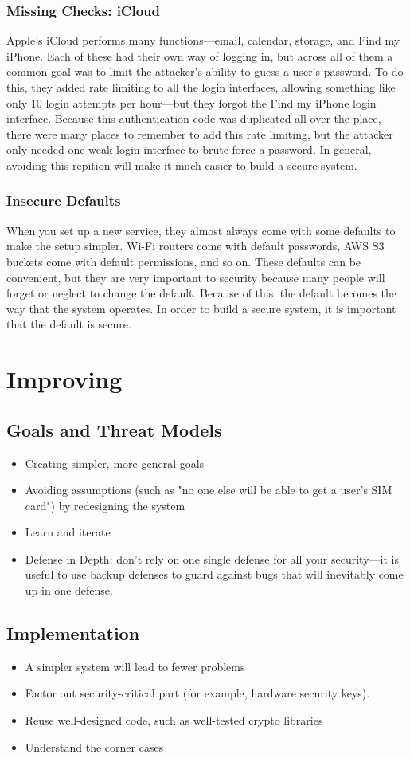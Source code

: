 \subsubsection{Missing Checks: iCloud}
Apple's iCloud performs many functions---email, calendar, storage, and Find my iPhone. Each of these had their own way of logging in, but across all of them a common goal was to limit the attacker's ability to guess a user's password. To do this, they added rate limiting to all the login interfaces, allowing something like only 10 login attempts per hour---but they forgot the Find my iPhone login interface. Because this authentication code was duplicated all over the place, there were many places to remember to add this rate limiting, but the attacker only needed one weak login interface to brute-force a password. In general, avoiding this repition will make it much easier to build a secure system.

\subsubsection{Insecure Defaults}
When you set up a new service, they almost always come with some defaults to make the setup simpler. Wi-Fi routers come with default passwords, AWS S3 buckets come with default permissions, and so on. These defaults can be convenient, but they are very important to security because many people will forget or neglect to change the default. Because of this, the default becomes the way that the system operates. In order to build a secure system, it is important that the default is secure.



\section{Improving}
\subsection{Goals and Threat Models}
\begin{itemize}
	\item Creating simpler, more general goals
	\item Avoiding assumptions (such as "no one else will be able to get a user's SIM card") by redesigning the system
	\item Learn and iterate
	\item Defense in Depth: don't rely on one single defense for all your security---it is useful to use backup defenses to guard against bugs that will inevitably come up in one defense.
\end{itemize}

\subsection{Implementation}
\begin{itemize}
	\item A simpler system will lead to fewer problems
	\item Factor out security-critical part (for example, hardware security keys).
	\item Reuse well-designed code, such as well-tested crypto libraries
	\item Understand the corner cases
\end{itemize}



